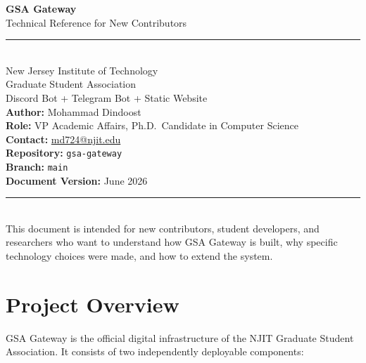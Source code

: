 \documentclass[12pt,letterpaper]{article}
\begin{document}
\begin{titlepage}
  \centering
  \vspace*{2cm}
  {\Huge\bfseries\color{njitred} GSA Gateway\\[0.5em]}
  {\Large\color{darkgray} Technical Reference for New Contributors}\\[2em]
  \rule{0.6\textwidth}{0.4pt}\\[1.5em]
  {\large New Jersey Institute of Technology\\
   Graduate Student Association\\[1em]
   Discord Bot + Telegram Bot + Static Website}\\[2em]
  {\normalsize
    \textbf{Author:} Mohammad Dindoost\\
    \textbf{Role:} VP Academic Affairs, Ph.D.\ Candidate in Computer Science\\
    \textbf{Contact:} \href{mailto:md724@njit.edu}{md724@njit.edu}\\[1em]
    \textbf{Repository:} \texttt{gsa-gateway}\\
    \textbf{Branch:} \texttt{main}\\[1em]
    \textbf{Document Version:} June 2026
  }\\[3em]
  \rule{0.6\textwidth}{0.4pt}\\[1em]
  {\small This document is intended for new contributors, student developers, and
   researchers who want to understand how GSA Gateway is built, why specific
   technology choices were made, and how to extend the system.}
\end{titlepage}

\tableofcontents
\newpage

\section{Project Overview}

GSA Gateway is the official digital infrastructure of the NJIT Graduate Student
Association. It consists of two independently deployable components:
\end{document}
